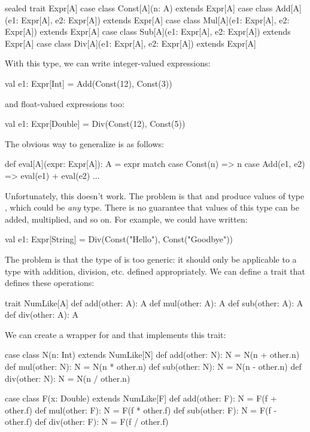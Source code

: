 \documentclass{book}
\begin{document}
\begin{scalacode}
sealed trait Expr[A]
case class Const[A](n: A) extends Expr[A]
case class Add[A](e1: Expr[A], e2: Expr[A]) extends Expr[A]
case class Mul[A](e1: Expr[A], e2: Expr[A]) extends Expr[A]
case class Sub[A](e1: Expr[A], e2: Expr[A]) extends Expr[A]
case class Div[A](e1: Expr[A], e2: Expr[A]) extends Expr[A]
\end{scalacode}

With this type, we can write integer-valued expressions:
\begin{scalacode}
val e1: Expr[Int] = Add(Const(12), Const(3))
\end{scalacode}
and float-valued expressions too:
\begin{scalacode}
val e1: Expr[Double] = Div(Const(12), Const(5))
\end{scalacode}

The obvious way to generalize  is as follows:

\begin{scalacode}
def eval[A](expr: Expr[A]): A = expr match {
  case Const(n) => n
  case Add(e1, e2) => eval(e1) + eval(e2)
  ...
}
\end{scalacode}

Unfortunately, this doesn't work. The problem is that 
and  produce values of type , which could
be \emph{any} type. There is no guarantee that values of this type can
be added, multiplied, and so on. For example, we could have written:

\begin{scalacode}
val e1: Expr[String] = Div(Const("Hello"), Const("Goodbye"))
\end{scalacode}

The problem is that the type of  is too generic: it should
only be applicable to a type with addition, division, etc. defined appropriately.
We can define a trait that defines these operations:

\begin{scalacode}
trait NumLike[A] {
  def add(other: A): A
  def mul(other: A): A
  def sub(other: A): A
  def div(other: A): A
}
\end{scalacode}

We can create a wrapper for  and 
that implements this trait:

\begin{scalacode}
case class N(n: Int) extends NumLike[N] {
  def add(other: N): N = N(n + other.n)
  def mul(other: N): N = N(n * other.n)
  def sub(other: N): N = N(n - other.n)
  def div(other: N): N = N(n / other.n)
}

case class F(x: Double) extends NumLike[F] {
  def add(other: F): N = F(f + other.f)
  def mul(other: F): N = F(f * other.f)
  def sub(other: F): N = F(f - other.f)
  def div(other: F): N = F(f / other.f)
}
\end{scalacode}
\end{document}
